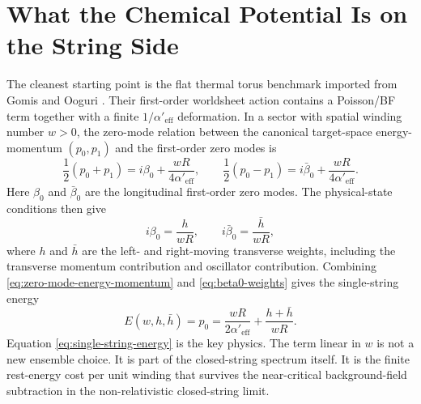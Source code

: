 \documentclass[11pt]{article}
\newcommand{\Aeff}{\alpha'_{\mathrm{eff}}}
\begin{document}
\section{What the Chemical Potential Is on the String Side}
The cleanest starting point is the flat thermal torus benchmark imported from Gomis and Ooguri \cite{gomis2000nonrelativisticclosedstringtheory}. Their first-order worldsheet action contains a Poisson/BF term together with a finite $1/\Aeff$ deformation. In a sector with spatial winding number $w>0$, the zero-mode relation between the canonical target-space energy-momentum $(p_0,p_1)$ and the first-order zero modes is
\begin{equation}\label{eq:zero-mode-energy-momentum}
\frac{1}{2}(p_0+p_1)=i\beta_0+\frac{wR}{4\Aeff},
\qquad
\frac{1}{2}(p_0-p_1)=i\bar\beta_0+\frac{wR}{4\Aeff}.
\end{equation}
Here $\beta_0$ and $\bar\beta_0$ are the longitudinal first-order zero modes. The physical-state conditions then give
\begin{equation}\label{eq:beta0-weights}
i\beta_0=\frac{h}{wR},
\qquad
i\bar\beta_0=\frac{\bar h}{wR},
\end{equation}
where $h$ and $\bar h$ are the left- and right-moving transverse weights, including the transverse momentum contribution and oscillator contribution. Combining \eqref{eq:zero-mode-energy-momentum} and \eqref{eq:beta0-weights} gives the single-string energy
\begin{equation}\label{eq:single-string-energy}
E(w,h,\bar h)=p_0=\frac{wR}{2\Aeff}+\frac{h+\bar h}{wR}.
\end{equation}
Equation \eqref{eq:single-string-energy} is the key physics. The term linear in $w$ is not a new ensemble choice. It is part of the closed-string spectrum itself. It is the finite rest-energy cost per unit winding that survives the near-critical background-field subtraction in the non-relativistic closed-string limit.
\end{document}
